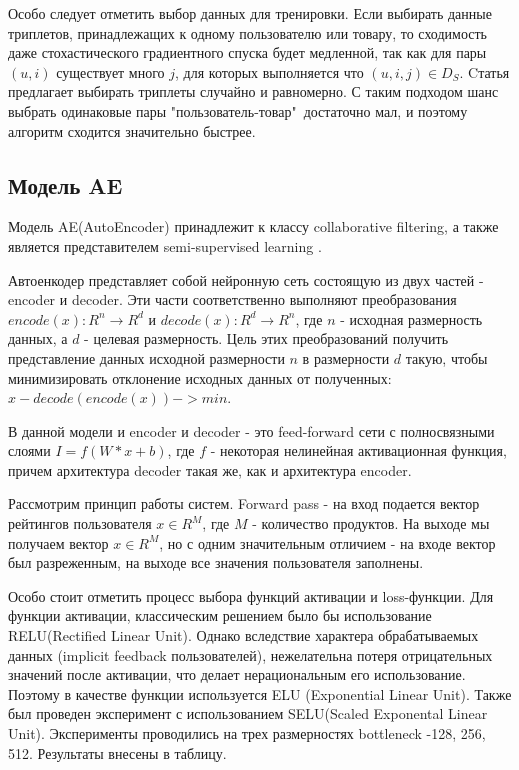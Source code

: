 \documentclass[14pt]{mmcs_article}
\begin{document}
Особо следует отметить выбор данных для тренировки. Если выбирать данные триплетов, принадлежащих к одному пользователю или товару, то сходимость даже стохастического градиентного спуска будет медленной, так как для пары $(u,i)$ существует много $j$, для которых выполняется что $(u,i,j) \in D_S$. Cтатья \cite{BPR:1205} предлагает выбирать триплеты случайно и равномерно. С таким подходом шанс выбрать одинаковые пары "пользователь-товар"\ достаточно мал, и поэтому алгоритм сходится значительно быстрее.

\subsection{ Модель AE}
Модель AE(AutoEncoder) принадлежит к классу collaborative filtering, а также является представителем semi-supervised learning \cite{AE:a1}. 

Автоенкодер представляет собой нейронную сеть состоящую из двух частей - encoder и decoder. Эти части соответственно выполняют преобразования  $encode(x) : R^n \rightarrow R^d$ и $decode(x) : R^d \rightarrow R^n$, где $n$ - исходная размерность данных, а $d$ - целевая размерность. Цель этих преобразований получить представление данных исходной размерности $n$ в размерности $d$ такую, чтобы минимизировать отклонение исходных данных от полученных: $x - decode(encode(x)) -> min$.

В данной модели и encoder и decoder - это feed-forward сети с полносвязными слоями $I = f(W*x + b)$, где $f$ - некоторая нелинейная активационная функция, причем архитектура decoder такая же, как и архитектура encoder. 

Рассмотрим принцип работы систем. Forward pass - на вход подается вектор рейтингов пользователя $x \in R^M$, где $M$ - количество продуктов. На выходе мы получаем вектор $x \in R^M$, но с одним значительным отличием - на входе вектор был разреженным, на выходе все значения пользователя заполнены.

Особо стоит отметить процесс выбора функций активации и loss-функции. Для функции активации, классическим решением было бы использование RELU(Rectified Linear Unit). Однако вследствие характера обрабатываемых данных (implicit feedback пользователей), нежелательна потеря отрицательных значений после активации, что делает нерациональным его использование. Поэтому в качестве функции используется ELU (Exponential Linear Unit). Также был проведен эксперимент с использованием SELU(Scaled Exponental Linear Unit). Эксперименты проводились на трех размерностях bottleneck -128, 256, 512. Результаты внесены в таблицу.\\
\end{document}
